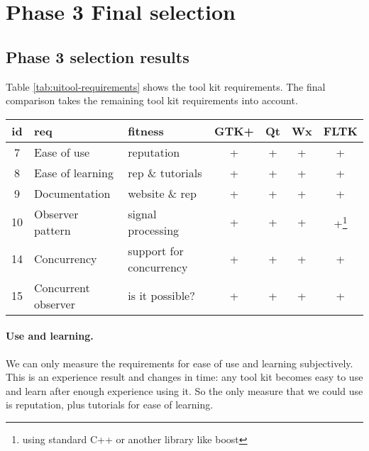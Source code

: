 \section{Phase 3 Final selection}

\subsection{Phase 3 selection results} 
\label{sec:phase3appendix}

Table \ref{tab:uitool-requirements} shows the tool kit requirements.  The final
comparison takes the remaining tool kit requirements into account.

\vspace{1em}
\begin{minipage}{.95\textwidth}
	\begin{center}
		\small\sf
		\begin{tabular}{|c|p{9em}|p{8em}|cccc|}
			\hline
			{\bf id} & {\bf req}             & {\bf fitness}           & {\bf GTK+} & {\bf Qt} & {\bf Wx} & {\bf FLTK}\\
			\hline
			    7    & Ease of use           & reputation              & +                      & + & + & +\\
			    8    & Ease of learning      & rep \& tutorials        & +                      & + & + & +\\
			    9    & Documentation         & website \& rep          & +                      & + & + & + \\
			    10   & Observer pattern      & signal processing       & +                      & + & + & 
			    +\footnote{using standard C++ or another library like boost\label{fn:c++}} \\
			    14   & Concurrency           & support for concurrency & +                      & + & + & +\footref{fn:c++} \\
			    15   & Concurrent observer   & is it possible?         & +                      & + & + & +\footref{fn:c++} \\
				\hline
		\end{tabular}
		\label{tab:final-comparison}
	\end{center}
\end{minipage}

\paragraph{Use and learning.} We can only measure the requirements for ease of
use and learning subjectively. This is an experience result and changes in
time: any tool kit becomes easy to use and learn after enough experience using
it. So the only measure that we could use is reputation, plus tutorials for
ease of learning. 

